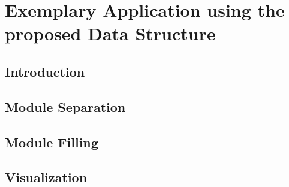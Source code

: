 \chapter{Exemplary Application using the proposed Data Structure}
\section{Introduction}
\section{Module Separation}
\section{Module Filling}
\section{Visualization}